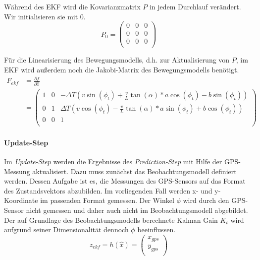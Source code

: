 \documentclass[11pt]{article}
\begin{document}
Während des EKF wird die Kovarianzmatrix $P$ in jedem Durchlauf verändert. Wir initialisieren sie mit $0$. 
\begin{equation}\label{EKF-Initiale-Kovarianzmatrix}
	P_{0} = \begin{pmatrix}
		0 & 0 & 0 \\
		0 & 0 & 0 \\
		0 & 0 & 0 \\
	  \end{pmatrix}
\end{equation}

Für die Linearisierung des Bewegungsmodells, d.h. zur Aktualisierung von $P$, im EKF wird außerdem noch die Jakobi-Matrix des Bewegungsmodells benötigt.
\begin{equation}\label{EKF-Motion-Model-Jakobi-Matrix}
\begin{split}
	F_{ekf} &= \frac{\partial f}{\partial \hat{x}} \\
	&= \begin{pmatrix}
		1 & 0 & -\Delta T(v\sin(\phi_t)+\frac{v}{L}\tan(\alpha)*a\cos(\phi_t)-b\sin(\phi_t)) \\
		0 & 1 & \Delta T(v\cos(\phi_t)-\frac{v}{L}\tan(\alpha)*a\sin(\phi_t)+b\cos(\phi_t)) \\
		0 & 0 & 1 \\
	  \end{pmatrix}
\end{split}
\end{equation}


\paragraph{Update-Step}
Im \textit{Update-Step} werden die Ergebnisse des \textit{Prediction-Step} mit Hilfe der GPS-Messung aktualisiert. Dazu muss zunächst das Beobachtungsmodell definiert werden. Dessen Aufgabe ist es, die Messungen des GPS-Sensors auf das Format des Zustandsvektors abzubilden. Im vorliegenden Fall werden x- und y-Koordinate im passenden Format gemessen. Der Winkel $\phi$ wird durch den GPS-Sensor nicht gemessen und daher auch nicht im Beobachtungsmodell abgebildet. Der auf Grundlage des Beobachtungsmodells berechnete Kalman Gain $K_t$ wird aufgrund seiner Dimensionalität dennoch $\phi$ beeinflussen.
\begin{equation}\label{EKF-Observation-Model}
	z_{ekf} = h(\hat{x}) = \begin{pmatrix}
		x_{gps} \\
		y_{gps} \\
	\end{pmatrix}
\end{equation}
\end{document}
